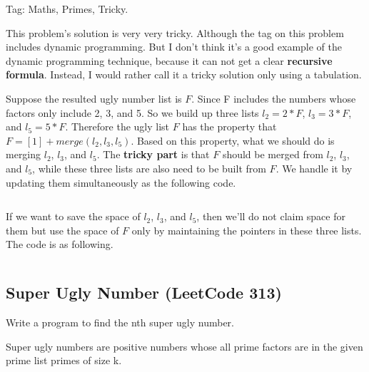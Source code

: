 \documentclass[11pt]{article}
\begin{document}
Tag: Maths, Primes, Tricky.

This problem's solution is very very tricky.
Although the tag on this problem includes dynamic programming. 
But I don't think it's a good example of the dynamic programming technique, because it can not get a clear \textbf{recursive formula}.
Instead, I would rather call it a tricky solution only using a tabulation. 

Suppose the resulted ugly number list is $F$. 
Since F includes the numbers whose factors only include 2, 3, and 5. 
So we build up three lists $l_2=2*F$, $l_3=3*F$, and $l_5=5*F$.
Therefore the ugly list $F$ has the property that $F=[1]+ merge(l_2,l_3,l_5)$.
Based on this property, what we should do is merging $l_2$, $l_3$, and $l_5$. 
The \textbf{tricky part} is that $F$ should be merged from $l_2$, $l_3$, and $l_5$, while these three lists are also need to be built from $F$.
We handle it by updating them simultaneously as the following code. 

\inputminted[breaklines=true,frame=leftline, linenos=true]{python}{src/uglyNumberII.py}

If we want to save the space of $l_2$, $l_3$, and $l_5$, then we'll do not claim space for them but use the space of $F$ only by maintaining the pointers in these three lists. The code is as following.
\inputminted[breaklines=true,frame=leftline, linenos=true]{python}{src/uglyNumberII_singleList.py}


\subsection{Super Ugly Number (LeetCode 313)}
Write a program to find the nth super ugly number.

Super ugly numbers are positive numbers whose all prime factors are in the given prime list primes of size k.
\end{document}
